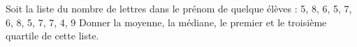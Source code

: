 
\begin{exercice}\label{exoSeconde-0074}

    Soit la liste du nombre de lettres dans le prénom de quelque élèves : 5,
8,
6,
5,
7,
6,
8,
5,
7,
7,
4,
9
Donner la moyenne, la médiane, le premier et le troisième quartile de cette liste.

\end{exercice}
